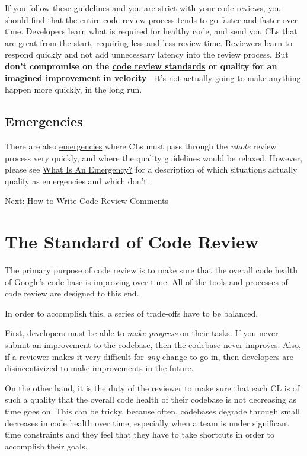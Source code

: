 \documentclass[
]{article}
\begin{document}
If you follow these guidelines and you are strict with your code
reviews, you should find that the entire code review process tends to go
faster and faster over time. Developers learn what is required for
healthy code, and send you CLs that are great from the start, requiring
less and less review time. Reviewers learn to respond quickly and not
add unnecessary latency into the review process. But \textbf{don't
compromise on the \href{standard.md}{code review standards} or quality
for an imagined improvement in velocity}---it's not actually going to
make anything happen more quickly, in the long run.

\subsection{Emergencies}\label{emergencies-1}

There are also \href{../emergencies.md}{emergencies} where CLs must pass
through the \emph{whole} review process very quickly, and where the
quality guidelines would be relaxed. However, please see
\href{../emergencies.md\#what}{What Is An Emergency?} for a description
of which situations actually qualify as emergencies and which don't.

Next: \href{comments.md}{How to Write Code Review Comments}

\section{The Standard of Code Review}\label{the-standard-of-code-review}

The primary purpose of code review is to make sure that the overall code
health of Google's code base is improving over time. All of the tools
and processes of code review are designed to this end.

In order to accomplish this, a series of trade-offs have to be balanced.

First, developers must be able to \emph{make progress} on their tasks.
If you never submit an improvement to the codebase, then the codebase
never improves. Also, if a reviewer makes it very difficult for
\emph{any} change to go in, then developers are disincentivized to make
improvements in the future.

On the other hand, it is the duty of the reviewer to make sure that each
CL is of such a quality that the overall code health of their codebase
is not decreasing as time goes on. This can be tricky, because often,
codebases degrade through small decreases in code health over time,
especially when a team is under significant time constraints and they
feel that they have to take shortcuts in order to accomplish their
goals.
\end{document}
